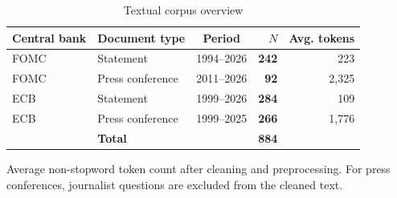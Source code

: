\begin{table}[htbp]
\centering
\caption{Textual corpus overview}
\label{tab:corpus_overview}
\begin{threeparttable}
\small
\begin{tabular}{llcrr}
\toprule
Central bank & Document type & Period & $N$ & Avg. tokens\tnote{a} \\
\midrule
FOMC & Statement        & 1994--2026 & \textbf{242} & 223 \\
FOMC & Press conference & 2011--2026 & \textbf{92}  & 2{,}325 \\
ECB  & Statement        & 1999--2026 & \textbf{284} & 109 \\
ECB  & Press conference & 1999--2025 & \textbf{266} & 1{,}776 \\
\midrule
     & \textbf{Total}   &            & \textbf{884} & \\
\bottomrule
\end{tabular}
\begin{tablenotes}\footnotesize
  \item[a] Average non-stopword token count after cleaning and preprocessing. For
  press conferences, journalist questions are excluded from the cleaned text.
\end{tablenotes}
\end{threeparttable}
\end{table}

